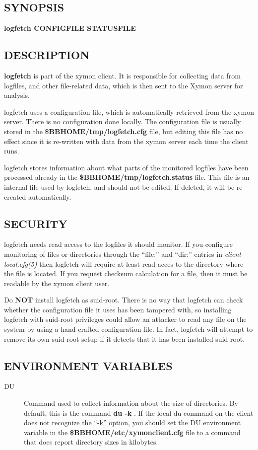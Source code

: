  
\subsection{SYNOPSIS}
\textbf{logfetch CONFIGFILE STATUSFILE}


 
\subsection{DESCRIPTION}
\textbf{logfetch}
 is part of the xymon client. It is responsible for collecting data from logfiles, and other file-related data, which is then sent to the Xymon server for analysis. 

  logfetch uses a configuration file, which is automatically retrieved from the xymon server. There is no configuration done locally. The configuration file is usually stored in the \textbf{\$BBHOME/tmp/logfetch.cfg}
 file, but editing this file has no effect since it is re-written with data from the xymon server each time the client runs. 


  logfetch stores information about what parts of the monitored logfiles have been processed already in the \textbf{\$BBHOME/tmp/logfetch.status}
 file. This file is an internal file used by logfetch, and should not be edited. If deleted, it will be re-created automatically. 


 
\subsection{SECURITY}
 logfetch needs read access to the logfiles it should monitor. If you configure monitoring of files or directories through the ``file:'' and ``dir:'' entries in \emph{client-local.cfg(5)}
 then logfetch will require at least read-acces to the directory where the file is located. If you request checksum calculation for a file, then it must be readable by the xymon client user. 

  Do \textbf{NOT}
 install logfetch as suid-root. There is no way that logfetch can check whether the configuration file it uses has been tampered with, so installing logfetch with suid-root privileges could allow an attacker to read any file on the system by using a hand-crafted configuration file. In fact, logfetch will attempt to remove its own suid-root setup if it detects that it has been installed suid-root. 


 
\subsection{ENVIRONMENT VARIABLES}
\begin{description}
\item[DU] Command used to collect information about the size of directories. By default, this is the command \textbf{du -k}
. If the local du-command on the client does not recognize the ``-k'' option, you should set the DU environment variable in the \textbf{\$BBHOME/etc/xymonclient.cfg}
 file to a command that does report directory sizes in kilobytes. 

 


\end{description}
